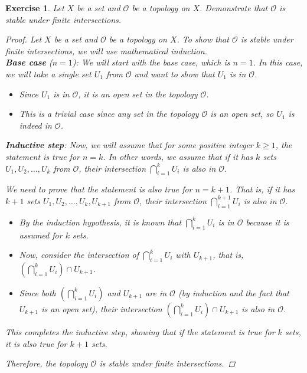 \documentclass{article}
\newtheorem{exercise}{Exercise}
\begin{document}
\begin{exercise}
    Let $X$ be a set and $\mathcal{O}$ be a topology on $X$. Demonstrate that $\mathcal{O}$ is stable under finite intersections.\\
    \begin{proof}

Let $X$ be a set and $\mathcal{O}$ be a topology on $X$. To show that $\mathcal{O}$ is stable under finite intersections, we will use mathematical induction.\\

\textbf{Base case} ($n=1$):
We will start with the base case, which is $n=1$. In this case, we will take a single set $U_1$ from $\mathcal{O}$ and want to show that $U_1$ is in $\mathcal{O}$.

\begin{itemize}
    \item Since $U_1$ is in $\mathcal{O}$, it is an open set in the topology $\mathcal{O}$.
    \item This is a trivial case since any set in the topology $\mathcal{O}$ is an open set, so $U_1$ is indeed in $\mathcal{O}$.
\end{itemize}

\textbf{Inductive step}:
Now, we will assume that for some positive integer $k \geq 1$, the statement is true for $n = k$. In other words, we assume that if it has $k$ sets $U_1, U_2, \ldots, U_k$ from $\mathcal{O}$, their intersection $\bigcap_{i=1}^{k} U_i$ is also in $\mathcal{O}$.

We need to prove that the statement is also true for $n = k+1$. That is, if it has $k+1$ sets $U_1, U_2, \ldots, U_k, U_{k+1}$ from $\mathcal{O}$, their intersection $\bigcap_{i=1}^{k+1} U_i$ is also in $\mathcal{O}$.

\begin{itemize}
    \item By the induction hypothesis, it is known that $\bigcap_{i=1}^{k} U_i$ is in $\mathcal{O}$ because it is assumed for $k$ sets.
    \item Now, consider the intersection of $\bigcap_{i=1}^{k} U_i$ with $U_{k+1}$, that is, $\left(\bigcap_{i=1}^{k} U_i\right) \cap U_{k+1}$.
    \item Since both $\left(\bigcap_{i=1}^{k} U_i\right)$ and $U_{k+1}$ are in $\mathcal{O}$ (by induction and the fact that $U_{k+1}$ is an open set), their intersection $\left(\bigcap_{i=1}^{k} U_i\right) \cap U_{k+1}$ is also in $\mathcal{O}$.
\end{itemize}

This completes the inductive step, showing that if the statement is true for $k$ sets, it is also true for $k+1$ sets.

Therefore, the topology $\mathcal{O}$ is stable under finite intersections.

\end{proof}
\end{exercise}
\end{document}
